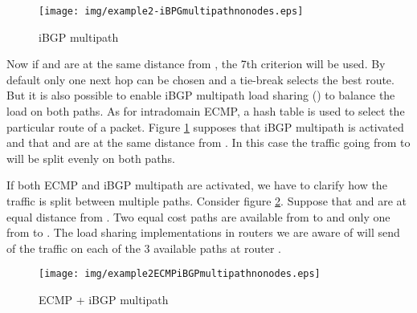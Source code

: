 \documentclass{acm_proc_article-sp}
\begin{document}
\begin{figure}[htbp]
  \centering
  \texttt{[image: img/example2-iBPGmultipathnonodes.eps]}
  \caption{iBGP multipath}
  \label{fig:example2iBGPmultipath}
\end{figure}

Now if  and  are at the same distance from , the 7th 
criterion will be used. By default only one next hop can be chosen
and a tie-break selects the best route. But it is also possible to enable iBGP
multipath load sharing (\cite{bgp2,bgp3}) to balance the load on both paths. As for intradomain
ECMP, a hash table is used to select the particular route of a
packet. Figure \ref{fig:example2iBGPmultipath} supposes that iBGP
multipath is activated and that  and  are at the same
distance from . In this case the traffic going from  to
 will be split evenly on both paths.

If both ECMP and iBGP multipath are activated,
we have to clarify how the traffic is split between multiple
paths. Consider figure \ref{fig:example2ecmpiBGPmultipath}.
Suppose that  and  are at equal distance from . Two
equal cost paths are available from  to  and only one from
 to . 
The load sharing implementations in routers we are aware of will send  
of the traffic on each of the 3 available paths at router . 

\begin{figure}[htbp]
  \centering
  \texttt{[image: img/example2ECMPiBGPmultipathnonodes.eps]}
  \caption{ECMP + iBGP multipath}
  \label{fig:example2ecmpiBGPmultipath}
\end{figure}
\end{document}
